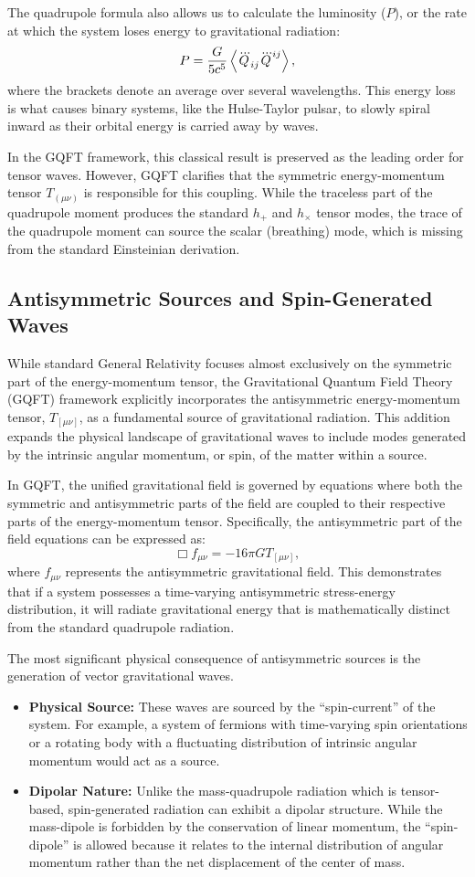 The quadrupole formula also allows us to calculate the luminosity ($P$), or the rate at which the system loses energy to gravitational radiation:
\[%
  P = \frac{G}{5c^5} \braket{\dddot{Q}_{ij} \dddot{Q}^{ij}}
,\]%
where the brackets denote an average over several wavelengths. This energy loss is what causes binary systems, like the Hulse-Taylor pulsar, to slowly spiral inward as their orbital energy is carried away by waves.

In the GQFT framework, this classical result is preserved as the leading order for tensor waves. However, GQFT clarifies that the symmetric energy-momentum tensor $T_{(\mu\nu)}$ is responsible for this coupling. While the traceless part of the quadrupole moment produces the standard $h_+$ and $h_\times$ tensor modes, the trace of the quadrupole moment can source the scalar (breathing) mode, which is missing from the standard Einsteinian derivation.

\subsection{Antisymmetric Sources and Spin-Generated Waves} While standard General Relativity focuses almost exclusively on the symmetric part of the energy-momentum tensor, the Gravitational Quantum Field Theory (GQFT) framework explicitly incorporates the antisymmetric energy-momentum tensor, $T_{[\mu\nu]}$, as a fundamental source of gravitational radiation. This addition expands the physical landscape of gravitational waves to include modes generated by the intrinsic angular momentum, or spin, of the matter within a source.

In GQFT, the unified gravitational field is governed by equations where both the symmetric and antisymmetric parts of the field are coupled to their respective parts of the energy-momentum tensor. Specifically, the antisymmetric part of the field equations can be expressed as:
\[%
  \Box f_{\mu\nu} = -16\pi G T_{[\mu\nu]}
,\]%
where $f_{\mu\nu}$ represents the antisymmetric gravitational field. This demonstrates that if a system possesses a time-varying antisymmetric stress-energy distribution, it will radiate gravitational energy that is mathematically distinct from the standard quadrupole radiation.

The most significant physical consequence of antisymmetric sources is the generation of vector gravitational waves.
\begin{itemize}
  \item \textbf{Physical Source:} These waves are sourced by the ``spin-current'' of the system. For example, a system of fermions with time-varying spin orientations or a rotating body with a fluctuating distribution of intrinsic angular momentum would act as a source.
  \item \textbf{Dipolar Nature:} Unlike the mass-quadrupole radiation which is tensor-based, spin-generated radiation can exhibit a dipolar structure. While the mass-dipole is forbidden by the conservation of linear momentum, the ``spin-dipole'' is allowed because it relates to the internal distribution of angular momentum rather than the net displacement of the center of mass.
\end{itemize}

